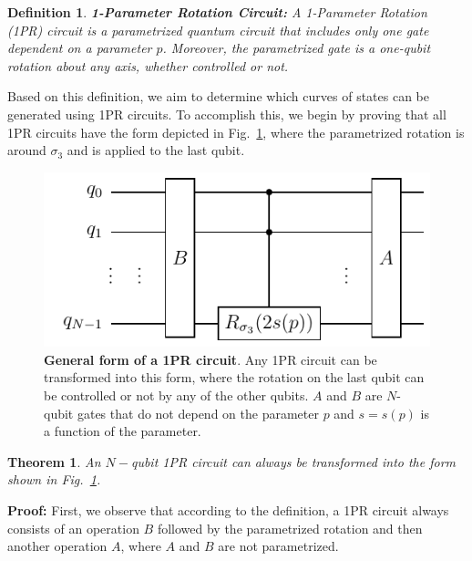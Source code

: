 \documentclass[10pt,letterpaper]{article} %
\newcommand{\fref}[1]{Fig.~\ref{#1}}
\newtheorem{definition}{Definition}
\newtheorem{theorem}{Theorem}
\begin{document}
\begin{definition}{\textbf{1-Parameter Rotation Circuit:}}
A 1-Parameter Rotation (1PR) circuit is a parametrized quantum
circuit that includes only one gate dependent on a parameter $p$.
Moreover, the parametrized gate is a one-qubit rotation about any axis,
whether controlled or not.
\end{definition}

Based on this definition, we aim to determine which curves of 
states can be generated using 1PR  
 circuits. 
To accomplish this, we begin by proving that all 1PR circuits have 
the form depicted in \fref{fig:1PR-circuit},
where the parametrized rotation is around $\sigma_3$ and
is applied to the last qubit.

\begin{figure} %
\centering
\includegraphics{images/OPR-circuit.pdf}
\caption{\textbf{General form of a 1PR circuit}.
Any 1PR circuit can be transformed into this form,
where the rotation on the last qubit
can be controlled or not by any of the other qubits.
$A$ and $B$
are $N$-qubit gates that do not depend on the parameter $p$ and
$s= s(p)$ is a function of the parameter.
 
}
\label{fig:1PR-circuit}
\end{figure} %

\begin{theorem}
An $N-$qubit 1PR circuit can always be transformed 
into the form shown in \fref{fig:1PR-circuit}.
\end{theorem}
\textbf{Proof:} 
First, we observe that according to the
definition, a 1PR circuit always consists of an operation $B$ followed 
by the parametrized rotation and then another operation $A$, 
where $A$ and $B$ are not parametrized.
\end{document}
